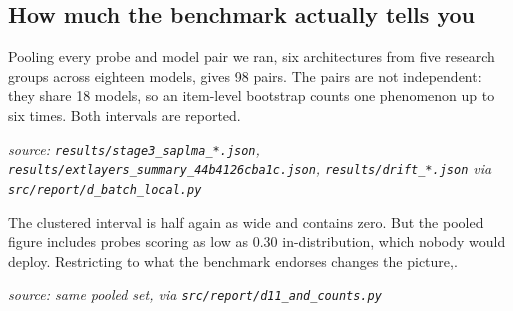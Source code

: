 \documentclass[10pt]{article}
\begin{document}
\subsection{How much the benchmark actually tells you}

Pooling every probe and model pair we ran, six architectures from five research groups across eighteen models, gives 98 pairs. The pairs are not independent: they share 18 models, so an item-level bootstrap counts one phenomenon up to six times. Both intervals are reported.

{\footnotesize\raggedright\sloppy \emph{source: \texttt{results/stage3\_saplma\_*.json}, \texttt{results/extlayers\_summary\_44b4126cba1c.json}, \texttt{results/drift\_*.json} via \texttt{src/report/d\_batch\_local.py}}\par}

\begin{table}[H]
\centering
\small
{}
\end{table}

The clustered interval is half again as wide and contains zero. But the pooled figure includes probes scoring as low as 0.30 in-distribution, which nobody would deploy. Restricting to what the benchmark endorses changes the picture,.

{\footnotesize\raggedright\sloppy \emph{source: same pooled set, via \texttt{src/report/d11\_and\_counts.py}}\par}

\begin{table}[H]
\centering
\small
{}
\end{table}
\end{document}
